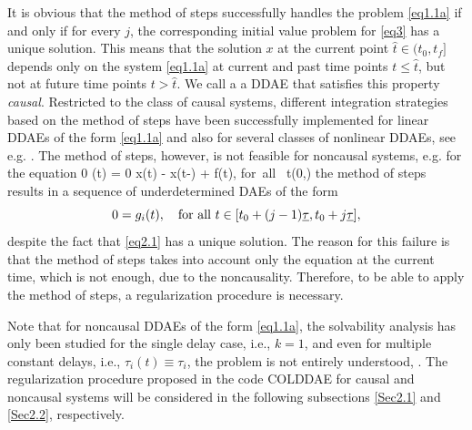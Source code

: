 \documentclass[final,reqno]{siamltex}
\begin{document}
It is obvious that the method of steps successfully handles the problem \eqref{eq1.1a} if and only if for every $j$, the corresponding initial value problem for \eqref{eq3} has a unique solution. This means that the solution $x$ at the current point $\hat t\in(t_0,t_f]$ depends only on the system \eqref{eq1.1a} at current and past time points $t \leq \hat t$, but not at future time points $t > \hat t$. We call  a a DDAE that satisfies this property \emph{causal}. Restricted to the class of causal systems, different integration strategies based on the method of steps have been successfully implemented for
linear DDAEs of the form \eqref{eq1.1a} and also for several classes of nonlinear DDAEs, see e.g. \cite{AscP95,BakPT02,GugH07,Hau97,ShaG06}.
The method of steps, however, is not feasible for noncausal systems, e.g. for the equation
%
\be\label{eq2.1}
  0 \cdot {}(t) = 0 \cdot x(t) - x(t-\tau) + f(t), \quad \mbox{for all } t\in (0,\infty)
\ee
%
the method of steps  results in a sequence of underdetermined DAEs of the form
%
\[
 0 = g_i(t), \quad \mbox{for all } t \in [t_0+(j-1)\underline{\tau},t_0+j\underline{\tau}],
\]
%
despite the fact that \eqref{eq2.1} has a unique solution.
The reason for this failure is that the method of steps takes into account only the equation at the current time, which is not enough,
due to the noncausality. Therefore, to be able to apply the method of steps, a regularization procedure is necessary.

Note that for noncausal DDAEs of the form \eqref{eq1.1a}, the solvability analysis has only been studied for
the single delay case, i.e., $k=1$, and even for multiple constant delays, i.e., $\tau_i(t) \equiv \tau_i$, the problem is not entirely understood, \cite{HaM14,Ha15}.
The regularization procedure proposed in the code COLDDAE for causal and noncausal systems will be considered in the following subsections \ref{Sec2.1} and \ref{Sec2.2}, respectively.
\end{document}
